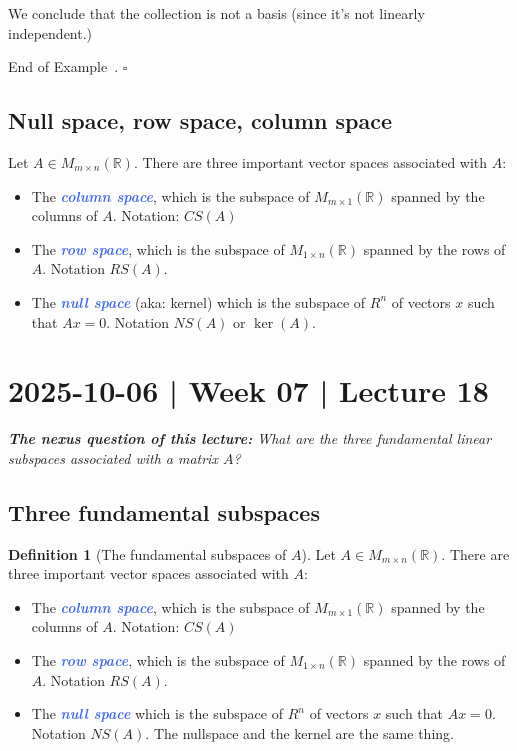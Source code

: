 \documentclass[10pt]{article}
\newcommand{\demph}[1]{\textcolor{RoyalBlue}{\textbf{\slshape #1}}} %
\theoremstyle{definition}
\newtheorem{definition}[theorem]{Definition}
\newtheorem{example}[theorem]{Example}
\renewenvironment{example}
{\begin{oldexample}}
  {\par\smallskip\hfill   End of Example~\theexample. $\square$    \par\end{oldexample}}
\newcommand{\R}{\mathbb{R}}           %
\begin{document}
\begin{example}
\begin{enumerate}
    We conclude that the collection is not a basis (since it's not linearly
    independent.)
  \end{enumerate}
\end{example}

\subsection{Null space, row space, column space}

Let $A\in M_{m\times n}(\R)$. There are three important vector spaces
associated with $A:$

\begin{itemize}
  \item The \demph{column space}, which is the subspace of $M_{m\times 1}(\R)$
  spanned by the columns of $A$. Notation: $CS(A)$ 
  \item The \demph{row space}, which is the subspace of $M_{1\times n}(\R)$
  spanned by the rows of $A$. Notation $RS(A)$.
  \item The \demph{null space} (aka: kernel) which is the subspace of $R^{n}$
  of vectors $x$ such that $Ax=0$. Notation $NS(A)$ or $\ker(A)$.
\end{itemize}

\newpage
\section{2025-10-06 | Week 07 | Lecture 18}

\begin{center}
  \begin{tcolorbox}[width=0.9\textwidth, colback=white, colframe=black]
    \textit{\textbf{The nexus question of this lecture:} What are the three
      fundamental linear subspaces associated with a matrix $A$?}
  \end{tcolorbox}
\end{center}

\subsection{Three fundamental subspaces}
\begin{definition}[The fundamental subspaces of $A$]
  \label{def:fundamental-subspaces-a}
  Let $A\in M_{m\times n}(\R)$. There are three important vector spaces
  associated with $A:$

  \begin{itemize}
    \item The \demph{column space}, which is the subspace of
    $M_{m\times 1}(\R)$ spanned by the columns of $A$. Notation: $CS(A)$
    \item The \demph{row space}, which is the subspace of $M_{1\times n}(\R)$
    spanned by the rows of $A$. Notation $RS(A)$.
    \item The \demph{null space} which is the subspace of $R^{n}$ of vectors
    $x$ such that $Ax=0$. Notation $NS(A)$. The nullspace and the kernel are
    the same thing.
  \end{itemize}
\end{definition}
\end{document}
